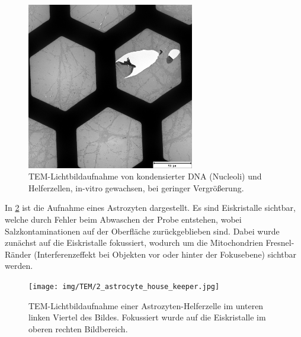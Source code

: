 \begin{figure}[!ht]
    \centering
    \includegraphics[width=0.65\textwidth]{img/TEM/1_low_mag_artifacts.jpg}
    \caption{TEM-Lichtbildaufnahme von kondensierter DNA (Nucleoli) und Helferzellen, in-vitro gewachsen, bei geringer Vergrößerung.} %
    \label{fig:tem:waben}
\end{figure}

In \cref{fig:tem:ahk} ist die Aufnahme eines Astrozyten dargestellt.
Es sind Eiskristalle sichtbar, welche durch Fehler beim Abwaschen der Probe entstehen, wobei Salzkontaminationen auf der Oberfläche zurückgeblieben sind.
Dabei wurde zunächst auf die Eiskristalle fokussiert, wodurch um die Mitochondrien Fresnel-Ränder (Interferenzeffekt bei Objekten vor oder hinter der Fokusebene) sichtbar werden.

\begin{figure}[!ht]
    \centering
    \texttt{[image: img/TEM/2\_astrocyte\_house\_keeper.jpg]}
    \caption{TEM-Lichtbildaufnahme einer Astrozyten-Helferzelle im unteren linken Viertel des Bildes. Fokussiert wurde auf die Eiskristalle im oberen rechten Bildbereich.}
    \label{fig:tem:ahk}
\end{figure}


